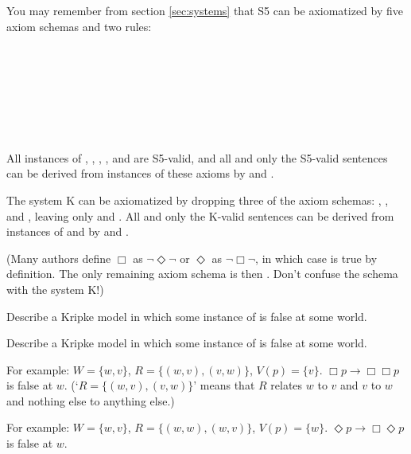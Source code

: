 You may remember from section \ref{sec:systems} that S5 can be axiomatized by
five axiom schemas and two rules:
%
\begin{principles}
  \\
  \\
  \\
  \\
  \\
  \\
\end{principles}
%
All instances of , , , , and  are S5-valid, and
all and only the S5-valid sentences can be derived from instances of these axioms
by  and .

The system K can be axiomatized by dropping three of the axiom schemas: ,
, and , leaving only  and . All and only the K-valid
sentences can be derived from instances of  and  by 
and .

(Many authors define $\Box$ as $\neg\Diamond\neg$ or $\Diamond$ as
$\neg\Box\neg$, in which case  is true by definition. The only
remaining axiom schema is then . Don't confuse the schema  with the
system K!)

\begin{exercise}
  \begin{exlist}
    \item Describe a Kripke model in which some instance of  is false at
    some world.
    \item Describe a Kripke model in which some instance of  is false at
    some world.
  \end{exlist}
\end{exercise}
\begin{solution}
  \begin{sollist}
    \item For example: $W = \{ w,v \}$, $R = \{ (w,v), (v,w) \}$,
    $V(p) = \{ v \}$. $\Box p \to \Box\Box p$ is false at $w$.
    (`$R = \{ (w,v), (v,w) \}$' means that $R$ relates $w$ to $v$ and $v$ to $w$
    and nothing else to anything else.)
    \item For example: $W = \{ w,v \}$, $R = \{ (w,w), (w,v) \}$,
    $V(p) = \{ w \}$. $\Diamond p \to \Box\Diamond p$ is false at $w$.
  \end{sollist}
\end{solution}

